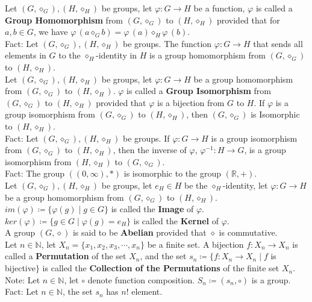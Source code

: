 \documentclass[11pt]{article}
\newcommand{\R}{\mathbb{R}}
\newcommand{\N}{\mathbb{N}}
\newcommand{\note}{\color{gray}Note: \color{black}}
\newcommand{\fact}{\color{gray}Fact: \color{black}}
\begin{document}
		\noindent Let $(G,\diamond_G),(H,\diamond_H)$ be groups, let $\varphi :G \to H$ be a function, $\varphi$ is called a \textbf{Group Homomorphism} from $(G,\diamond_G)$ to $(H,\diamond_H)$ provided that for $a,b \in G$, we have $\varphi \, (a \diamond_G b) = \varphi\, (a) \diamond_H \varphi\, (b)$.\\
		\fact Let $(G,\diamond_G),(H,\diamond_H)$ be groups. The function  $\varphi :G \to H$ that sends all elements in $G$ to the $\diamond_H$-identity in $H$ is a group homomorphism from $(G,\diamond_G)$ to $(H,\diamond_H)$.\\
		
		\noindent Let $(G,\diamond_G),(H,\diamond_H)$ be groups, let $\varphi :G \to H$ be a group homomorphism from $(G,\diamond_G)$ to $(H,\diamond_H)$. $\varphi$ is called a \textbf{Group Isomorphism} from $(G,\diamond_G)$ to $(H,\diamond_H)$ provided that $\varphi$ is a bijection from $G$ to $H$. If $\varphi$ is a group isomorphism from $(G,\diamond_G)$ to $(H,\diamond_H)$, then $(G,\diamond_G)$ is Isomorphic to $(H,\diamond_H)$.\\
		\fact Let $(G,\diamond_G),(H,\diamond_H)$ be groups. If $\varphi :G \to H$ is a group isomorphism from $(G,\diamond_G)$ to $(H,\diamond_H)$, then the inverse of $\varphi$, $\varphi^{-1} :H \to G$, is a group isomorphism from $(H,\diamond_H)$ to $(G,\diamond_G)$.\\
		\fact The group $((0,\infty),\ast)$ is isomorphic to the group $(\R,+)$.\\
		
		\noindent Let $(G,\diamond_G),(H,\diamond_H)$ be groups, let $e_H \in H$ be the $\diamond_H$-identity, let $\varphi :G \to H$ be a group homomorphism from $(G,\diamond_G)$ to $(H,\diamond_H)$. $im(\varphi) \coloneqq \{ \varphi(g) \mid g \in G\}$ is called the \textbf{Image} of $\varphi$. $ker(\varphi) \coloneqq \{ g \in G \mid \varphi(g)=e_H \}$ is called the \textbf{Kernel} of $\varphi$.\\
		
		\noindent A group $(G,\diamond)$ is said to be \textbf{Abelian} provided that $\diamond$ is commutative.\\
		
		\noindent Let $n \in \N$, let $X_n=\{x_1,x_2,x_3,\cdots,x_n\}$ be a finite set. A bijection $f:X_n \to X_n$ is called a \textbf{Permutation} of the set $X_n$, and the set $s_n \coloneqq \{ f: X_n \to X_n \mid f$ is bijective$\}$ is called the \textbf{Collection of the Permutations} of the finite set $X_n$.\\
 		\note Let $n \in \N$, let $\circ$ denote function composition. $S_n \coloneqq (s_n, \circ)$ is a group.\\
		\fact Let $n \in \N$, the set $s_n$ has $n!$ element.\\
\end{document}
